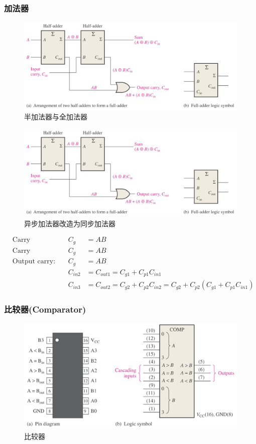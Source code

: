 \subsubsection{加法器}
\begin{figure}[htbp]
	\centering
	\includegraphics[width=0.8\linewidth]{fig/adder.jpg}
	\caption{半加法器与全加法器}
\end{figure}
\begin{figure}[htbp]
	\centering
	\includegraphics[width=0.8\linewidth]{fig/adder.jpg}
	\caption{异步加法器改造为同步加法器}
\end{figure}
\[\begin{aligned}
&\text{Carry generation: }&C_g&=AB\\
&\text{Carry propagation: }&C_g&=AB\\
&\text{Output carry: }&C_g&=AB\\
& &C_{in2}&=C_{out1}=C_{g1}+C_{p1}C_{in1}\\
& &C_{in3}&=C_{out2}=C_{g2}+C_{p2}C_{in2}=C_{g2}+C_{p2}(C_{g1}+C_{p1}C_{in1})
\end{aligned}\]
\subsubsection{比较器(Comparator)}
\begin{figure}[htbp]
	\centering
	\includegraphics[width=0.8\linewidth]{fig/comparator.jpg}
	\caption{比较器}
\end{figure}
